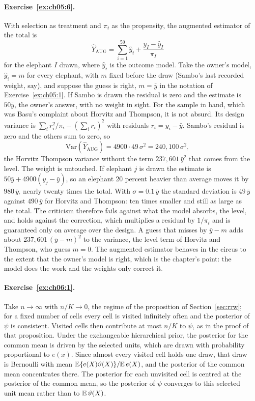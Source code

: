 \paragraph{Exercise~\ref{ex:ch05:6}.} With selection as treatment and $\pi_i$ as the propensity, the augmented estimator of the total is
\[
\hat Y_{\mathrm{AUG}} = \sum_{i=1}^{50}\hat y_i + \frac{y_I - \hat y_I}{\pi_I}
\]
for the elephant $I$ drawn, where $\hat y_i$ is the outcome model. Take the owner's model, $\hat y_i = m$ for every elephant, with $m$ fixed before the draw (Sambo's last recorded weight, say), and suppose the guess is right, $m = \bar y$ in the notation of Exercise~\ref{ex:ch05:1}. If Sambo is drawn the residual is zero and the estimate is $50\bar y$, the owner's answer, with no weight in sight. For the sample in hand, which was Basu's complaint about Horvitz and Thompson, it is not absurd. Its design variance is $\sum_i r_i^2/\pi_i - (\sum_i r_i)^2$ with residuals $r_i = y_i - \bar y$. Sambo's residual is zero and the others sum to zero, so
\[
\mathrm{Var}(\hat Y_{\mathrm{AUG}}) = 4900 \cdot 49\,\sigma^2 = 240{,}100\,\sigma^2,
\]
the Horvitz Thompson variance without the term $237{,}601\,\bar y^2$ that comes from the level. The weight is untouched. If elephant $j$ is drawn the estimate is $50\bar y + 4900(y_j - \bar y)$, so an elephant 20 percent heavier than average moves it by $980\,\bar y$, nearly twenty times the total. With $\sigma = 0.1\,\bar y$ the standard deviation is $49\,\bar y$ against $490\,\bar y$ for Horvitz and Thompson: ten times smaller and still as large as the total. The criticism therefore fails against what the model absorbs, the level, and holds against the correction, which multiplies a residual by $1/\pi_i$ and is guaranteed only on average over the design. A guess that misses by $\bar y - m$ adds about $237{,}601\,(\bar y - m)^2$ to the variance, the level term of Horvitz and Thompson, who guess $m = 0$. The augmented estimator behaves in the circus to the extent that the owner's model is right, which is the chapter's point: the model does the work and the weights only correct it.

\paragraph{Exercise~\ref{ex:ch06:1}.} Take $n \to \infty$ with $n/K \to 0$, the regime of the proposition of Section~\ref{sec:rrw}; for a fixed number of cells every cell is visited infinitely often and the posterior of $\psi$ is consistent. Visited cells then contribute at most $n/K$ to $\psi$, as in the proof of that proposition. Under the exchangeable hierarchical prior, the posterior for the common mean is driven by the selected units, which are drawn with probability proportional to $e(x)$. Since almost every visited cell holds one draw, that draw is Bernoulli with mean $\mathbb{E}\{e(X)\vartheta(X)\}/\mathbb{E}\,e(X)$, and the posterior of the common mean concentrates there. The posterior for each unvisited cell is centred at the posterior of the common mean, so the posterior of $\psi$ converges to this selected unit mean rather than to $\mathbb{E}\,\vartheta(X)$.

